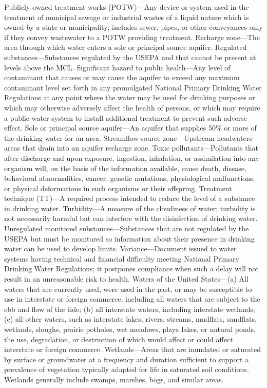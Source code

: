 \documentclass{article}
\begin{document}
Publicly owned treatment works (POTW)---Any device or system used in the
treatment of municipal sewage or industrial wastes of a liquid nature
which is owned by a state or municipality; includes sewer, pipes, or
other conveyances only if they convey wastewater to a POTW providing
treatment. Recharge zone---The area through which water enters a sole or
principal source aquifer. Regulated substances---Substances regulated by
the USEPA and that cannot be present at levels above the MCL.
Significant hazard to public health---Any level of contaminant that
causes or may cause the aquifer to exceed any maximum contaminant level
set forth in any promulgated National Primary Drinking Water Regulations
at any point where the water may be used for drinking purposes or which
may otherwise adversely affect the health of persons, or which may
require a public water system to install additional treatment to prevent
such adverse effect. Sole or principal source aquifer---An aquifer that
supplies 50\% or more of the drinking water for an area. Streamflow
source zone---Upstream headwaters areas that drain into an aquifer
recharge zone. Toxic pollutants---Pollutants that after discharge and
upon exposure, ingestion, inhalation, or assimilation into any organism
will, on the basis of the information available, cause death, disease,
behavioral abnormalities, cancer, genetic mutations, physiological
malfunctions, or physical deformations in such organisms or their
offspring. Treatment technique (TT)---A required process intended to
reduce the level of a substance in drinking water. Turbidity---A measure
of the cloudiness of water; turbidity is not necessarily harmful but can
interfere with the disinfection of drinking water. Unregulated monitored
substances---Substances that are not regulated by the USEPA but must be
monitored so information about their presence in drinking water can be
used to develop limits. Variance---Document issued to water systems
having technical and financial difficulty meeting National Primary
Drinking Water Regulations; it postpones compliance when such a delay
will not result in an unreasonable risk to health. Waters of the United
States---(a) All waters that are currently used, were used in the past,
or may be susceptible to use in interstate or foreign commerce,
including all waters that are subject to the ebb and flow of the tide;
(b) all interstate waters, including interstate wetlands; (c) all other
waters, such as interstate lakes, rivers, streams, mudflats, sandflats,
wetlands, sloughs, prairie potholes, wet meadows, playa lakes, or
natural ponds, the use, degradation, or destruction of which would
affect or could affect interstate or foreign commerce. Wetlands---Areas
that are inundated or saturated by surface or groundwater at a frequency
and duration sufficient to support a prevalence of vegetation typically
adapted for life in saturated soil conditions. Wetlands generally
include swamps, marshes, bogs, and similar areas.
\end{document}

